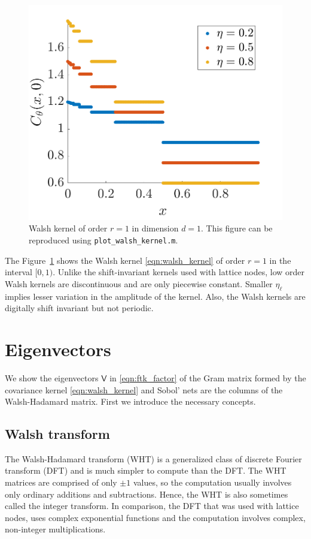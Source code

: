 \documentclass{svjour3}                     %
\newcommand{\mV}{\mathsf{V}}
\newcommand{\code}[1]{\texttt{#1}}
\newcommand\figref{Figure~\ref}
\newcommand{\JRNote}[1]{{\textcolor{green}{JR: #1}}}
\begin{document}
\begin{figure}
	\centering
	\includegraphics[width=0.9\linewidth]{"figures/walsh_kernel dim_1"}
	\caption[Walsh kernel]{Walsh kernel of order $r=1$ in dimension $d=1$. This figure can be reproduced using \code{plot\_walsh\_kernel.m}. %
	}
	\label{fig:walshkernel-dim1}
\end{figure}

The \figref{fig:walshkernel-dim1} shows the Walsh kernel \eqref{eqn:walsh_kernel} of order $r=1$ in the interval $[0,1)$. Unlike the shift-invariant kernels used with lattice nodes, low order Walsh kernels are discontinuous and are only piecewise constant. Smaller $\eta_\ell$ implies lesser variation in the amplitude of the kernel. Also, the Walsh kernels are digitally shift invariant but not periodic.

\section{Eigenvectors}

We show the eigenvectors $\mV$ in \eqref{eqn:ftk_factor} of the Gram matrix formed by the covariance kernel \eqref{eqn:walsh_kernel} and Sobol' nets are the columns of the Walsh-Hadamard matrix. First we introduce the necessary concepts.

\subsection{Walsh transform}
The Walsh-Hadamard transform (WHT) is a generalized class of discrete Fourier transform (DFT) and is much simpler to compute than the DFT. The WHT matrices are comprised of only $\pm 1$ values, so the computation usually involves only ordinary additions and subtractions. Hence, the WHT is also sometimes called the integer transform. In comparison, the DFT that was used with lattice nodes,  uses complex exponential functions and the computation involves complex, non-integer multiplications. 
\end{document}

